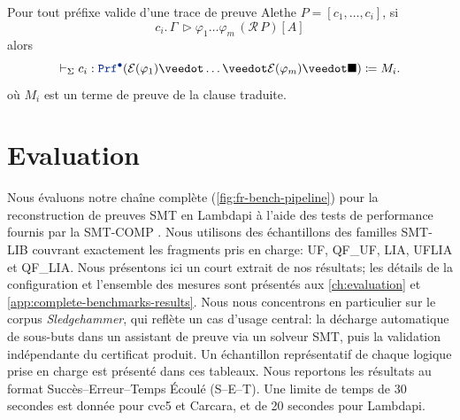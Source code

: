 \begin{theorem*}\label{theorem:fr-soundness}
  Pour tout préfixe valide d'une trace de preuve Alethe $P = [c_1, \dots, c_i]$, si
  \[
    c_i.\,\Gamma\, \triangleright \varphi_1 \dots \varphi_m \, (\mathcal{R}\,P)[A]
  \]
  alors
  \[
    \vdash_\Sigma c_i : \pid (\E{\varphi_1} \veedot \dots  \veedot \E{\varphi_m} \veedot \nil) \coloneq M_i.
  \] où $M_i$  est un terme de preuve de la clause traduite.
\end{theorem*}

\section*{Evaluation}

Nous évaluons notre chaîne complète (\cref{fig:fr-bench-pipeline}) pour la reconstruction de preuves SMT en Lambdapi à l'aide des tests de performance fournis par la SMT-COMP \cite{SMT-COMP}.
Nous utilisons des échantillons des familles SMT-LIB couvrant exactement les fragments pris en charge: UF, QF\_UF, LIA, UFLIA et QF\_LIA.
Nous présentons ici un court extrait de nos résultats; les détails de la configuration et l'ensemble des mesures sont présentés aux \cref{ch:evaluation} et \cref{app:complete-benchmarks-results}.
Nous nous concentrons en particulier sur le corpus \emph{Sledgehammer}, qui reflète un cas d'usage central: la décharge automatique de sous-buts dans un assistant de preuve via un solveur SMT, puis la validation indépendante du certificat produit.
Un échantillon représentatif de chaque logique prise en charge est présenté dans ces tableaux.
Nous reportons les résultats au format Succès--Erreur--Temps Écoulé (S--E--T). Une limite de temps de 30 secondes est donnée pour cvc5 et Carcara, et de 20 secondes pour Lambdapi.


\makeatother

